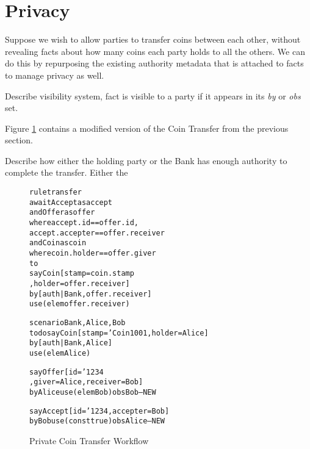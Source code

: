 
\clearpage{}
\section{Privacy}

Suppose we wish to allow parties to transfer coins between each other, without revealing facts about how many coins each party holds to all the others. We can do this by repurposing the existing authority metadata that is attached to facts to manage privacy as well.

Describe visibility system, fact is visible to a party if it appears in its \emph{by} or \emph{obs} set.

Figure \ref{f:PrivateCoinTransfer} contains a modified version of the Coin Transfer from the previous section.

Describe how either the holding party or the Bank has enough authority to complete the transfer. Either the


\begin{figure}
\begin{small}
\begin{alltt}
rule  transfer
await Accept  as accept
 and  Offer   as offer
      where   accept.id       == offer.id,
              accept.accepter == offer.receiver
 and  Coin    as coin
      where   coin.holder     == offer.giver
to
      say Coin   [ stamp  = coin.stamp
                 , holder = offer.receiver]
      by  [auth| Bank, offer.receiver]
      use (elem offer.receiver)

scenario Bank, Alice, Bob
to do say Coin   [ stamp = 'Coin1001, holder = Alice]
      by  [auth| Bank, Alice]
      use (elem Alice)

      say Offer  [ id    = '1234
                 , giver = Alice, receiver = Bob]
      by  Alice use (elem Bob)   obs Bob          -- NEW

      say Accept [ id = '1234,    accepter = Bob]
      by  Bob   use (const true) obs Alice        -- NEW
\end{alltt}
\end{small}

\caption{Private Coin Transfer Workflow}
\label{f:PrivateCoinTransfer}
\end{figure}
